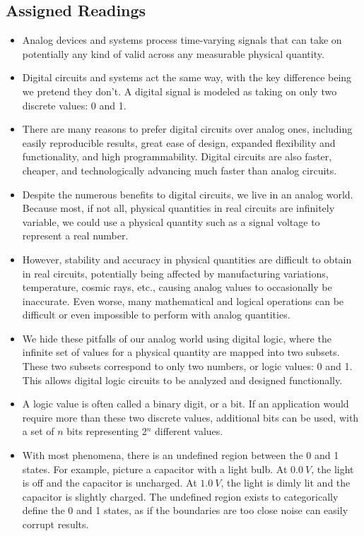 \documentclass[10pt,a4paper]{article}
\begin{document}
\subsection{Assigned Readings}
\begin{itemize}
\item Analog devices and systems process time-varying signals that can take on potentially any kind of valid across any measurable physical quantity. 
\item Digital circuits and systems act the same way, with the key difference being we pretend they don't. A digital signal is modeled as taking on only two discrete values: 0 and 1. 
\item There are many reasons to prefer digital circuits over analog ones, including easily reproducible results, great ease of design, expanded flexibility and functionality, and high programmability. Digital circuits are also faster, cheaper, and technologically advancing much faster than analog circuits. 
\item Despite the numerous benefits to digital circuits, we live in an analog world. Because most, if not all, physical quantities in real circuits are infinitely variable, we could use a physical quantity such as a signal voltage to represent a real number. 
\item However, stability and accuracy in physical quantities are difficult to obtain in real circuits, potentially being affected by manufacturing variations, temperature, cosmic rays, etc., causing analog values to occasionally be inaccurate. Even worse, many mathematical and logical operations can be difficult or even impossible to perform with analog quantities. 
\item We hide these pitfalls of our analog world using digital logic, where the infinite set of values for a physical quantity are mapped into two subsets. These two subsets correspond to only two numbers, or logic values: 0 and 1. This allows digital logic circuits to be analyzed and designed functionally. 
\item A logic value is often called a binary digit, or a bit. If an application would require more than these two discrete values, additional bits can be used, with a set of $n$ bits representing 2$^n$ different values. 
\item With most phenomena, there is an undefined region between the 0 and 1 states. For example, picture a capacitor with a light bulb. At $\SI{0.0}{V}$, the light is off and the capacitor is uncharged. At $\SI{1.0}{V}$, the light is dimly lit and the capacitor is slightly charged. The undefined region exists to categorically define the 0 and 1 states, as if the boundaries are too close noise can easily corrupt results. 

\end{itemize}
\end{document}
